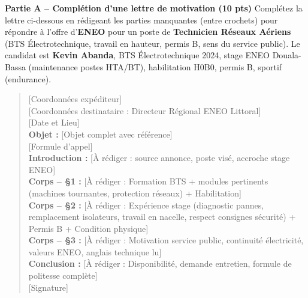\documentclass[11pt]{article}
\begin{document}
\begin{exercice}
\textbf{Partie A -- Complétion d'une lettre de motivation (10 pts)}
Complétez la lettre ci-dessous en rédigeant les parties manquantes (entre crochets) pour répondre à l'offre d'\textbf{ENEO} pour un poste de \textbf{Technicien Réseaux Aériens} (BTS Électrotechnique, travail en hauteur, permis B, sens du service public). Le candidat est \textbf{Kevin Abanda}, BTS Électrotechnique 2024, stage ENEO Douala-Bassa (maintenance postes HTA/BT), habilitation H0B0, permis B, sportif (endurance).

\begin{quote}
[Coordonnées expéditeur] \\[0pt]
[Coordonnées destinataire : Directeur Régional ENEO Littoral] \\[0pt]
[Date et Lieu] \\[0pt]
\textbf{Objet :} [Objet complet avec référence] \\[0pt]
[Formule d'appel] \\[0pt]
\textbf{Introduction :} [À rédiger : source annonce, poste visé, accroche stage ENEO] \\[0pt]
\textbf{Corps -- §1 :} [À rédiger : Formation BTS + modules pertinents (machines tournantes, protection réseaux) + Habilitation] \\[0pt]
\textbf{Corps -- §2 :} [À rédiger : Expérience stage (diagnostic pannes, remplacement isolateurs, travail en nacelle, respect consignes sécurité) + Permis B + Condition physique] \\[0pt]
\textbf{Corps -- §3 :} [À rédiger : Motivation service public, continuité électricité, valeurs ENEO, anglais technique lu] \\[0pt]
\textbf{Conclusion :} [À rédiger : Disponibilité, demande entretien, formule de politesse complète] \\[0pt]
[Signature]
\end{quote}


\end{exercice}
\end{document}
